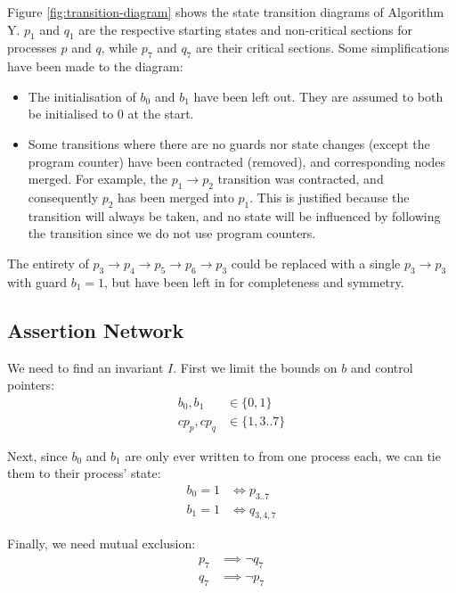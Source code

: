 \documentclass[a4paper]{scrartcl}
\begin{document}
Figure \ref{fig:transition-diagram} shows the state transition diagrams of Algorithm Y. \(p_1\) and \(q_1\) are the respective starting states and non-critical sections for processes \(p\) and \(q\), while \(p_7\) and \(q_7\) are their critical sections. Some simplifications have been made to the diagram:
\begin{itemize}
    \item The initialisation of \(b_0\) and \(b_1\) have been left out. They are assumed to both be initialised to 0 at the start.
    \item Some transitions where there are no guards nor state changes (except the program counter) have been contracted (removed), and corresponding nodes merged. For example, the \(p_1 \to p_2\) transition was contracted, and consequently \(p_2\) has been merged into \(p_1\). This is justified because the transition will always be taken, and no state will be influenced by following the transition since we do not use program counters.
\end{itemize}

The entirety of \(p_3 \to p_4 \to p_5 \to p_6 \to p_3\) could be replaced with a single \(p_3 \to p_3\) with guard \(b_1 = 1\), but have been left in for completeness and symmetry.

\subsection{Assertion Network}
We need to find an invariant \(I\). First we limit the bounds on \(b\) and control pointers:
\begin{align}
    b_0, b_1 &\in \{0, 1\} \label{eq:b-bounds} \\
    cp_p, cp_q &\in \{1, 3..7\} \label{eq:cp-bounds}
\end{align}

Next, since \(b_0\) and \(b_1\) are only ever written to from one process each, we can tie them to their process' state:
\begin{align}
    b_0 = 1 &\iff p_{3..7} \label{eq:b_0} \\
    b_1 = 1 &\iff q_{3, 4, 7} \label{eq:b_1}
\end{align}

Finally, we need mutual exclusion:
\begin{align}
    p_7 &\implies \lnot q_7 \label{eq:p_7} \\
    q_7 &\implies \lnot p_7 \label{eq:q_7}
\end{align}
\end{document}
